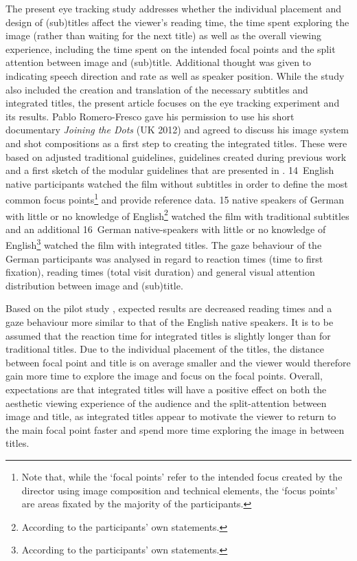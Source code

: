 \documentclass[output=paper]{langsci/langscibook}
\begin{document}
The present eye tracking study addresses whether the individual placement and design of (sub)titles affect the viewer's reading time, the time spent exploring the image (rather than waiting for the next title) as well as the overall viewing experience, including the time spent on the intended focal points and the split attention between image and (sub)title. Additional thought was given to indicating speech direction and rate as well as speaker position. While the study also included the creation and translation of the necessary subtitles and integrated titles, the present article focuses on the eye tracking experiment and its results. Pablo Romero-Fresco gave his permission to use his short documentary \textit{Joining the Dots} (UK 2012) and agreed to discuss his image system and shot compositions as a first step to creating the integrated titles. These were based on adjusted traditional guidelines, guidelines created during previous work \citep{fox2012} and a first sketch of the modular guidelines that are presented in \citet{fox2015}. 14~English native participants watched the film without subtitles in order to define the most common focus points\footnote{Note that, while the `focal points' refer to the intended focus created by the director using image composition and technical elements, the `focus points' are areas fixated by the majority of the participants.} and provide reference data. 15 native speakers of German with little or no knowledge of English\footnote{According to the participants' own statements.
} watched the film with traditional subtitles and an additional 16~German native-speakers with little or no knowledge of English\footnote{According to the participants' own statements.
} watched the film with integrated titles. The gaze behaviour of the German participants was analysed in regard to reaction times (time to first fixation), reading times (total visit duration) and general visual attention distribution between image and (sub)title.

Based on the pilot study \citep{fox2012}, expected results are decreased reading times and a gaze behaviour more similar to that of the English native speakers. It is to be assumed that the reaction time for integrated titles is slightly longer than for traditional titles. Due to the individual placement of the titles, the distance between focal point and title is on average smaller and the viewer would therefore gain more time to explore the image and focus on the focal points. Overall, expectations are that integrated titles will have a positive effect on both the aesthetic viewing experience of the audience and the split-attention between image and title, as integrated titles appear to motivate the viewer to return to the main focal point faster and spend more time exploring the image in between titles.
\end{document}
